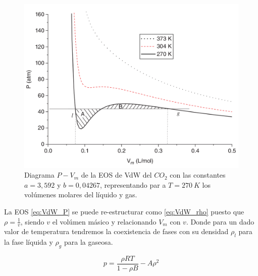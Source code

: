 \begin{figure}[h!]
	\centering
	\includegraphics[width=.8\textwidth]{figs/cap2/Diagrama_P_V_del_CO2_Multiphase_LBM}
	\caption{Diagrama $P - V_m$ de la EOS de VdW del $CO_2$ con las constantes $a = 3,592$ y $b = 0,04267$, representando par a $T = 270 \> K$ los volúmenes molares del líquido y gas. \cite{huang2015multiphase}}
	\label{fig:P_V_CO2}	
\end{figure}


La EOS \ref{eq:VdW_P} se puede re-estructurar como \ref{eq:VdW_rho} puesto que $\rho = \frac{1}{v}$, siendo $v$ el volúmen másico y relacionando $V_m$ con $v$. Donde para un dado valor de temperatura tendremos la coexistencia de fases con su densidad $\rho_l$ para la fase líquida y $\rho_g$ para la gaseosa.

\begin{equation}
p = \frac{\rho R T}{1- \rho B} - A {\rho}^{2}
\label{eq:VdW_rho}
\end{equation}


